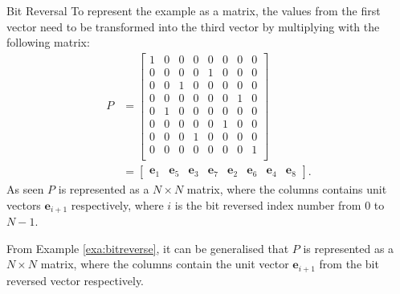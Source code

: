 \begin{example}{Bit Reversal}
    To represent the example as a matrix, the values from the first vector need to be transformed into the third vector by multiplying with the following matrix:
    \begin{align*}
        P&=
        \begin{bmatrix}
            1 & 0 & 0 & 0 & 0 & 0 & 0 & 0\\
            0 & 0 & 0 & 0 & 1 & 0 & 0 & 0\\
            0 & 0 & 1 & 0 & 0 & 0 & 0 & 0\\
            0 & 0 & 0 & 0 & 0 & 0 & 1 & 0\\
            0 & 1 & 0 & 0 & 0 & 0 & 0 & 0\\
            0 & 0 & 0 & 0 & 0 & 1 & 0 & 0\\
            0 & 0 & 0 & 1 & 0 & 0 & 0 & 0\\
            0 & 0 & 0 & 0 & 0 & 0 & 0 & 1\\
        \end{bmatrix}\\
        &=\begin{bmatrix}
        \mathbf{e}_1 & \mathbf{e}_5 & \mathbf{e}_3 & \mathbf{e}_7 & \mathbf{e}_2 & \mathbf{e}_6 & \mathbf{e}_4 & \mathbf{e}_8
        \end{bmatrix}.
 \end{align*}
   As seen $P$ is represented as a $N \times N$ matrix, where the columns contains unit vectors $\mathbf{e}_{i+1}$ respectively, where $i$ is the bit reversed index number from $0$ to $N-1$.
    \label{exa:bitreverse}
\end{example}
From Example \ref{exa:bitreverse}, it can be generalised that $P$ is represented as a $N \times N$ matrix, where the columns contain the unit vector $\mathbf{e}_{i+1}$ from the bit reversed vector respectively.

